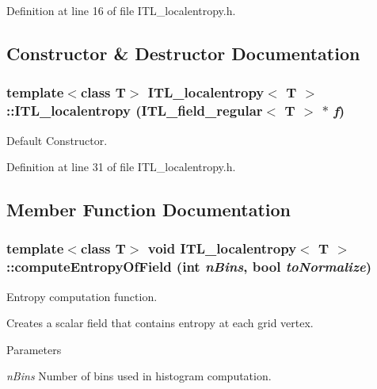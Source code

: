 Definition at line 16 of file ITL\_\-localentropy.h.



\subsection{Constructor \& Destructor Documentation}
\hypertarget{classITL__localentropy_adbb3a1033c4db7b0bafffb0935a05d1c}{
\subsubsection[{ITL\_\-localentropy}]{\setlength{\rightskip}{0pt plus 5cm}template$<$class T$>$ {\bf ITL\_\-localentropy}$<$ T $>$::{\bf ITL\_\-localentropy} ({\bf ITL\_\-field\_\-regular}$<$ T $>$ $\ast$ {\em f})}}
\label{classITL__localentropy_adbb3a1033c4db7b0bafffb0935a05d1c}


Default Constructor. 



Definition at line 31 of file ITL\_\-localentropy.h.



\subsection{Member Function Documentation}
\hypertarget{classITL__localentropy_a3ecdb23e82f2585f7e616ddcfb76f285}{
\subsubsection[{computeEntropyOfField}]{\setlength{\rightskip}{0pt plus 5cm}template$<$class T$>$ void {\bf ITL\_\-localentropy}$<$ T $>$::computeEntropyOfField (int {\em nBins}, \/  bool {\em toNormalize})}}
\label{classITL__localentropy_a3ecdb23e82f2585f7e616ddcfb76f285}


Entropy computation function. 

Creates a scalar field that contains entropy at each grid vertex. 
\begin{DoxyParams}{Parameters}
\item[{\em nBins}]Number of bins used in histogram computation. \end{DoxyParams}


